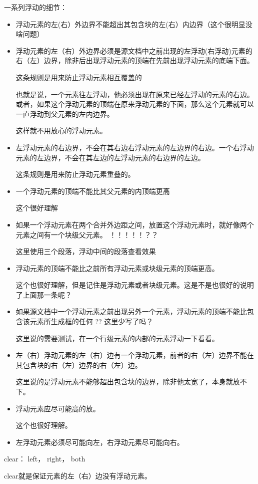 一系列浮动的细节：
\begin{itemize}

\item 浮动元素的左(右）外边界不能超出其包含块的左(右）内边界（这个很明显没啥问题）


\item 浮动元素的左（右）外边界必须是源文档中之前出现的左浮动(右浮动)元素的右（左）边界，除非后出现浮动元素的顶端在先前出现浮动元素的底端下面。


这条规则是用来防止浮动元素相互覆盖的

也就是说，一个元素往左浮动，他必须出现在原来已经左浮动的元素的右边。或者，如果这个浮动元素的顶端在原来浮动元素的下面，那么这个元素就可以一直浮动到父元素的左内边界。

这样就不用放心的浮动元素。

\item 左浮动元素的右边界，不会在其右边右浮动元素的左边界的右边。一个右浮动元素的左边界，不会在其左边的左浮动元素的右边界的左边。

这条规则是用来防止浮动元素重叠的。

\item 一个浮动元素的顶端不能比其父元素的内顶端更高

这个很好理解

\item 如果一个浮动元素在两个合并外边距之间，放置这个浮动元素时，就好像两个元素之间有一个块级父元素。   ！！！！！？？

这里使用三个段落，浮动中间的段落查看效果


\item 浮动元素的顶端不能比之前所有浮动元素或块级元素的顶端更高。

这个也很好理解，但是记住是浮动元素或者块级元素。这是不是也很好的说明了上面那一条呢？

\item 如果源文档中一个浮动元素之前出现另外一个元素，浮动元素的顶端不能比包含该元素所生成框的任何 ?? 这里少写了吗？

这里说的需要测试，在一个行级元素的内部的元素浮动一下看看。

\item 左（右）浮动元素的左（右）边有一个浮动元素，前者的右（左）边界不能在其包含块的右（左）边界的右（左）边。

这里说的是浮动元素不能够超出包含块的边界，除非他太宽了，本身就放不下。


\item 浮动元素应尽可能高的放。

这个也很好理解。

\item 左浮动元素必须尽可能向左，右浮动元素尽可能向右。

\end{itemize}


clear： left， right， both

clear就是保证元素的左（右）边没有浮动元素。

















